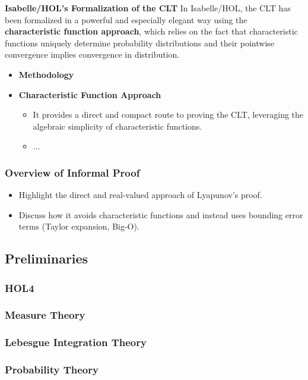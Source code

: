 \textbf{Isabelle/HOL's Formalization of the CLT}
In Isabelle/HOL, the CLT has been formalized in a powerful and especially elegant way using the \textbf{characteristic function approach}, which relies on the fact that characteristic functions uniquely determine probability distributions and their pointwise convergence implies convergence in distribution.
\cite{serafin2015formally}

\begin{itemize}
    \item \textbf{Methodology}
    \item \textbf{Characteristic Function Approach}
    \begin{itemize}
        \item It provides a direct and compact route to proving the CLT, leveraging the algebraic simplicity of characteristic functions.
        \item ...
    \end{itemize}
\end{itemize}


\subsubsection{Overview of Informal Proof}
\begin{itemize}
    \item Highlight the direct and real-valued approach of Lyapunov's proof.
    \item Discuss how it avoids characteristic functions and instead uses bounding error terms (Taylor expansion, Big-O).
\end{itemize}

\subsection{Preliminaries}
\subsubsection{HOL4}
\cite{tian2022assumption}
\subsubsection{Measure Theory}
\cite{qasim2016formalization}
\subsubsection{Lebesgue Integration Theory}
\cite{qasim2016formalization}
\subsubsection{Probability Theory}
\cite{qasim2016formalization}

